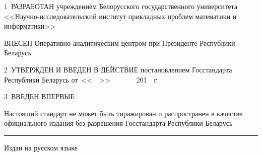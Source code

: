 \vskip0.2cm

1~РАЗРАБОТАН учреждением Белорусского государственного университета 
<<Научно-исследовательский институт прикладных проблем математики и 
информатики>>

ВНЕСЕН Оперативно-аналитическим центром при Президенте 
Республики Беларусь

2~УТВЕРЖДЕН И ВВЕДЕН В ДЕЙСТВИЕ постановлением Госстандарта Республики 
Беларусь от~<<$\phantom{\text{09}}$>> 
$\phantom{\text{января}}$~201$\phantom{\text{8}}$~г. 
\No~$\phantom{\text{9}}$ 

3~ВВЕДЕН ВПЕРВЫЕ

\vfill

Настоящий стандарт не может быть тиражирован и распространен в качестве 
официального издания без разрешения Госстандарта Республики Беларусь

\hrule
\vskip1mm
Издан на русском языке

\pagebreak
